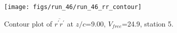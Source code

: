 \begin{figure}[H]
\centering
\texttt{[image: figs/run\_46/run\_46\_rr\_contour]}
\caption{Contour plot of $\overline{r^\prime r^\prime}$ at $z/c$=9.00, $V_{free}$=24.9, station 5.}
\end{figure}


